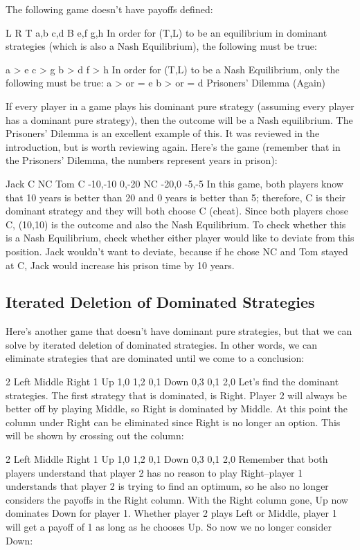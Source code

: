 The following game doesn't have payoffs defined:

L	R
T	a,b	c,d
B	e,f	g,h
In order for (T,L) to be an equilibrium in dominant strategies (which is also a Nash Equilibrium), the following must be true:

a > e
c > g
b > d
f > h
In order for (T,L) to be a Nash Equilibrium, only the following must be true:
a > or = e
b > or = d
Prisoners' Dilemma (Again)

If every player in a game plays his dominant pure strategy (assuming every player has a dominant pure strategy), then the outcome will be a Nash equilibrium. The Prisoners' Dilemma is an excellent example of this. It was reviewed in the introduction, but is worth reviewing again. Here's the game (remember that in the Prisoners' Dilemma, the numbers represent years in prison):

Jack
C	NC
Tom	C	-10,-10	0,-20
NC	-20,0	-5,-5
In this game, both players know that 10 years is better than 20 and 0 years is better than 5; therefore, C is their dominant strategy and they will both choose C (cheat). Since both players chose C, (10,10) is the outcome and also the Nash Equilibrium. To check whether this is a Nash Equilibrium, check whether either player would like to deviate from this position. Jack wouldn't want to deviate, because if he chose NC and Tom stayed at C, Jack would increase his prison time by 10 years.

\subsection{Iterated Deletion of Dominated Strategies}

Here's another game that doesn't have dominant pure strategies, but that we can solve by iterated deletion of dominated strategies. In other words, we can eliminate strategies that are dominated until we come to a conclusion:

2
Left	Middle	Right
1	Up	1,0	1,2	0,1
Down	0,3	0,1	2,0
Let's find the dominant strategies. The first strategy that is dominated, is Right. Player 2 will always be better off by playing Middle, so Right is dominated by Middle. At this point the column under Right can be eliminated since Right is no longer an option. This will be shown by crossing out the column:

2
Left	Middle	Right
1	Up	1,0	1,2	0,1
Down	0,3	0,1	2,0
Remember that both players understand that player 2 has no reason to play Right--player 1 understands that player 2 is trying to find an optimum, so he also no longer considers the payoffs in the Right column. With the Right column gone, Up now dominates Down for player 1. Whether player 2 plays Left or Middle, player 1 will get a payoff of 1 as long as he chooses Up. So now we no longer consider Down:

